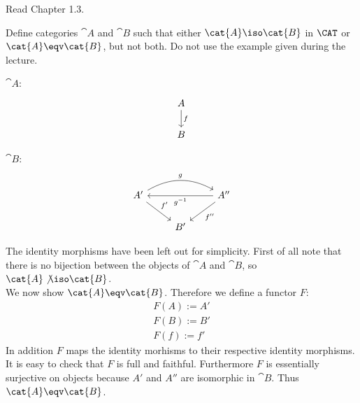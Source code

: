 \def\pathToRoot{../../}



\author{Joachim Bard, Maximilian Wuttke, Nikita Ziuzin}


\begin{hint}
  Read Chapter 1.3.
\end{hint}

\begin{exercise}
  Define categories $\cat{A}$ and $\cat{B}$ such that either $\cat{A} \iso \cat{B}$ in $\CAT$ or $\cat{A} \eqv \cat{B}$, but not both.
  Do not use the example given during the lecture.
\end{exercise}
\begin{answer}
    \begin{minipage}{0.5\textwidth}
        $\cat{A}$:
        \[
            \begin{tikzcd}
                A \arrow{d}{f}\\
                B
            \end{tikzcd}
        \]
    \end{minipage}
    \begin{minipage}{0.5\textwidth}
        $\cat{B}$:
        \[
            \begin{tikzcd}
                A' \arrow{dr}{f'} \arrow[bend left]{rr}{g} &    & A'' \arrow{dl}{f''} \arrow{ll}{g^{-1}} \\
                                                           & B' &
            \end{tikzcd}
        \]
    \end{minipage}
    The identity morphisms have been left out for simplicity.
    First of all note that there is no bijection between the objects of $\cat{A}$ and $\cat{B}$, so $\cat{A} \not\iso \cat{B}$.\\
    We now show $\cat{A} \eqv \cat{B}$.
    Therefore we define a functor $F$:
    \begin{align*}
        F(A) := A'\\
        F(B) := B'\\
        F(f) := f'
    \end{align*}
    In addition $F$ maps the identity morhisms to their respective identity morphisms.
    It is easy to check that $F$ is full and faithful.
    Furthermore $F$ is essentially surjective on objects because $A'$ and $A''$ are isomorphic in $\cat{B}$.
    Thus $\cat{A} \eqv \cat{B}$.
\end{answer}

